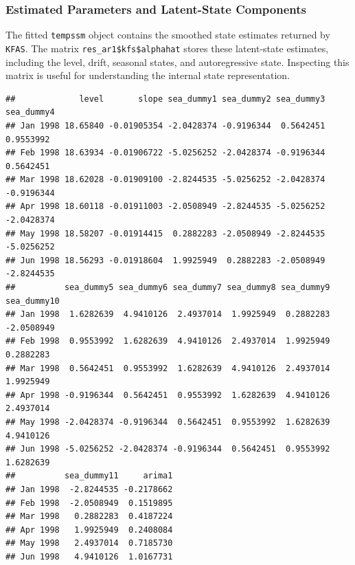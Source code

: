 \documentclass[
]{article}
\newenvironment{Shaded}{\begin{snugshade}}{\end{snugshade}}
\newcommand{\CommentTok}[1]{\textcolor[rgb]{0.56,0.35,0.01}{\textit{#1}}}
\newcommand{\FunctionTok}[1]{\textcolor[rgb]{0.13,0.29,0.53}{\textbf{#1}}}
\newcommand{\NormalTok}[1]{#1}
\newcommand{\OtherTok}[1]{\textcolor[rgb]{0.56,0.35,0.01}{#1}}
\newcommand{\SpecialCharTok}[1]{\textcolor[rgb]{0.81,0.36,0.00}{\textbf{#1}}}
\begin{document}
\subsubsection{Estimated Parameters and Latent-State
Components}\label{estimated-parameters-and-latent-state-components}

The fitted \texttt{tempssm} object contains the smoothed state estimates
returned by \texttt{KFAS}. The matrix \texttt{res\_ar1\$kfs\$alphahat}
stores these latent-state estimates, including the level, drift,
seasonal states, and autoregressive state. Inspecting this matrix is
useful for understanding the internal state representation.

\begin{Shaded}
\end{Shaded}

\begin{verbatim}
##             level       slope sea_dummy1 sea_dummy2 sea_dummy3 sea_dummy4
## Jan 1998 18.65840 -0.01905354 -2.0428374 -0.9196344  0.5642451  0.9553992
## Feb 1998 18.63934 -0.01906722 -5.0256252 -2.0428374 -0.9196344  0.5642451
## Mar 1998 18.62028 -0.01909100 -2.8244535 -5.0256252 -2.0428374 -0.9196344
## Apr 1998 18.60118 -0.01911003 -2.0508949 -2.8244535 -5.0256252 -2.0428374
## May 1998 18.58207 -0.01914415  0.2882283 -2.0508949 -2.8244535 -5.0256252
## Jun 1998 18.56293 -0.01918604  1.9925949  0.2882283 -2.0508949 -2.8244535
##          sea_dummy5 sea_dummy6 sea_dummy7 sea_dummy8 sea_dummy9 sea_dummy10
## Jan 1998  1.6282639  4.9410126  2.4937014  1.9925949  0.2882283  -2.0508949
## Feb 1998  0.9553992  1.6282639  4.9410126  2.4937014  1.9925949   0.2882283
## Mar 1998  0.5642451  0.9553992  1.6282639  4.9410126  2.4937014   1.9925949
## Apr 1998 -0.9196344  0.5642451  0.9553992  1.6282639  4.9410126   2.4937014
## May 1998 -2.0428374 -0.9196344  0.5642451  0.9553992  1.6282639   4.9410126
## Jun 1998 -5.0256252 -2.0428374 -0.9196344  0.5642451  0.9553992   1.6282639
##          sea_dummy11     arima1
## Jan 1998  -2.8244535 -0.2178662
## Feb 1998  -2.0508949  0.1519895
## Mar 1998   0.2882283  0.4187224
## Apr 1998   1.9925949  0.2408084
## May 1998   2.4937014  0.7185730
## Jun 1998   4.9410126  1.0167731
\end{verbatim}
\end{document}
